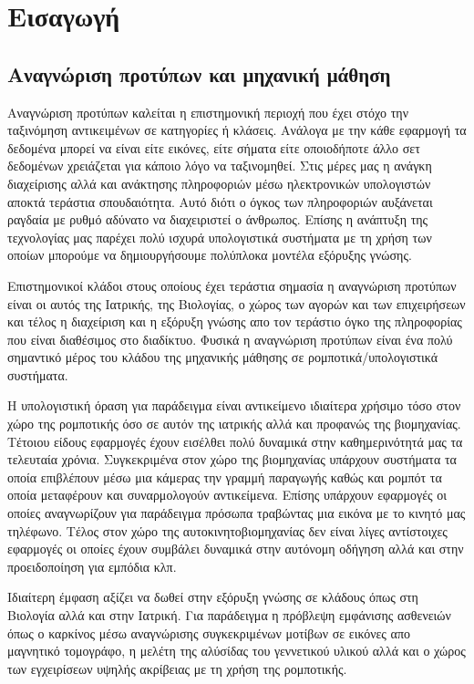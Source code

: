 
\chapter{Εισαγωγή}

\section{Αναγνώριση προτύπων και μηχανική μάθηση}
\par
Αναγνώριση προτύπων καλείται η επιστημονική περιοχή που έχει στόχο την ταξινόμηση αντικειμένων σε κατηγορίες ή κλάσεις. Ανάλογα με την κάθε εφαρμογή τα δεδομένα μπορεί να είναι είτε εικόνες, είτε σήματα είτε οποιοδήποτε άλλο σετ δεδομένων χρειάζεται για κάποιο λόγο να ταξινομηθεί. Στις μέρες μας η ανάγκη διαχείρισης αλλά και ανάκτησης πληροφοριών μέσω ηλεκτρονικών υπολογιστών αποκτά τεράστια σπουδαιότητα. Αυτό διότι ο όγκος των πληροφοριών αυξάνεται ραγδαία με ρυθμό αδύνατο να διαχειριστεί ο άνθρωπος. Επίσης η ανάπτυξη της τεχνολογίας μας παρέχει πολύ ισχυρά υπολογιστικά συστήματα με τη χρήση των οποίων μπορούμε να δημιουργήσουμε πολύπλοκα μοντέλα εξόρυξης γνώσης. 
\par
Επιστημονικοί κλάδοι στους οποίους έχει τεράστια σημασία η αναγνώριση προτύπων είναι οι αυτός της Ιατρικής, της Βιολογίας, ο χώρος των αγορών και των επιχειρήσεων και τέλος η διαχείριση και η εξόρυξη γνώσης απο τον τεράστιο όγκο της πληροφορίας που είναι διαθέσιμος στο διαδίκτυο. Φυσικά η αναγνώριση προτύπων είναι ένα πολύ σημαντικό μέρος του κλάδου της μηχανικής μάθησης σε ρομποτικά/υπολογιστικά συστήματα.
\par
Η υπολογιστική όραση για παράδειγμα είναι αντικείμενο ιδιαίτερα χρήσιμο τόσο στον χώρο της ρομποτικής όσο σε αυτόν της ιατρικής αλλά και προφανώς της βιομηχανίας. Τέτοιου είδους εφαρμογές έχουν εισέλθει πολύ δυναμικά στην καθημερινότητά μας τα τελευταία χρόνια. Συγκεκριμένα στον χώρο της βιομηχανίας υπάρχουν συστήματα τα οποία επιβλέπουν μέσω μια κάμερας την γραμμή παραγωγής καθώς και ρομπότ τα οποία μεταφέρουν και συναρμολογούν αντικείμενα. Eπίσης υπάρχουν εφαρμογές οι οποίες αναγνωρίζουν για παράδειγμα πρόσωπα τραβώντας μια εικόνα με το κινητό μας τηλέφωνο. Τέλος στον χώρο της αυτοκινητοβιομηχανίας δεν είναι λίγες αντίστοιχες εφαρμογές οι οποίες έχουν συμβάλει δυναμικά στην αυτόνομη οδήγηση αλλά και στην προειδοποίηση για εμπόδια κλπ.
\par
Ιδιαίτερη έμφαση αξίζει να δωθεί στην εξόρυξη γνώσης σε κλάδους όπως στη Βιολογία αλλά και στην Ιατρική. Για παράδειγμα η πρόβλεψη εμφάνισης ασθενειών όπως ο καρκίνος μέσω αναγνώρισης συγκεκριμένων μοτίβων σε εικόνες απο μαγνητικό τομογράφο, η μελέτη της αλύσίδας του γεννετικού υλικού αλλά και ο χώρος των εγχειρίσεων υψηλής ακρίβειας με τη χρήση της ρομποτικής.

